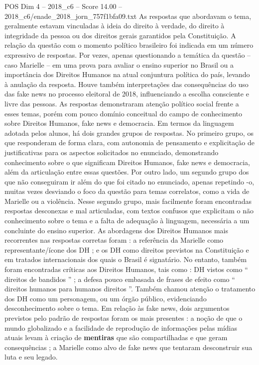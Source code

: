 \begin{textsample}{POS Dim 4 – 2018\_c6 – Score 14.00 – 2018\_c6/enade\_2018\_jorn\_757f1bfa09.txt}
As respostas que abordavam o tema, geralmente estavam vinculadas à ideia do direito à verdade, do direito à integridade da pessoa ou dos direitos gerais garantidos pela Constituição.
A relação da questão com o momento político brasileiro foi indicada em um número expressivo de respostas.
Por vezes, apenas questionando a temática da questão – caso Marielle – em uma prova para avaliar o ensino superior no Brasil ou a importância dos Direitos Humanos na atual conjuntura política do país, levando à anulação da resposta.
Houve também interpretações das consequências do uso das fake news no processo eleitoral de 2018, influenciando a escolha consciente e livre das pessoas.
As respostas demonstraram atenção político social frente a esses temas, porém com pouco domínio conceitual do campo de conhecimento sobre Direitos Humanos, fake news e democracia.
Em termos da linguagem adotada pelos alunos, há dois grandes grupos de respostas.
No primeiro grupo, os que responderam de forma clara, com autonomia de pensamento e explicitação de justificativas para os aspectos solicitados no enunciado, demonstrando conhecimento sobre o que significam Direitos Humanos, fake news e democracia, além da articulação entre essas questões.
Por outro lado, um segundo grupo dos que não conseguiram ir além do que foi citado no enunciado, apenas repetindo -o, muitas vezes desviando o foco da questão para temas correlatos, como a vida de Marielle ou a violência.
Nesse segundo grupo, mais facilmente foram encontradas respostas desconexas e mal articuladas, com textos confusos que explicitam o não conhecimento sobre o tema e a falta de adequação à linguagem, necessária a um concluinte do ensino superior.
As abordagens dos Direitos Humanos mais recorrentes nas respostas corretas foram : a referência da Marielle como representante/ícone dos DH ; e os DH como direitos previstos na Constituição e em tratados internacionais dos quais o Brasil é signatário.
No entanto, também foram encontradas críticas aos Direitos Humanos, tais como : DH vistos como “ direitos de bandidos ” ; a defesa pouco embasada de frases de efeito como “ direitos humanos para humanos direitos ”.
Também chamou atenção o tratamento dos DH como um personagem, ou um órgão público, evidenciando desconhecimento sobre o tema.
Em relação às fake news, dois argumentos previstos pelo padrão de respostas foram os mais presentes : a noção de que o mundo globalizado e a facilidade de reprodução de informações pelas mídias atuais levam à criação de \textbf{mentiras} que são compartilhadas e que geram consequências ; a Marielle como alvo de fake news que tentaram desconstruir sua luta e seu legado.

\end{textsample}
